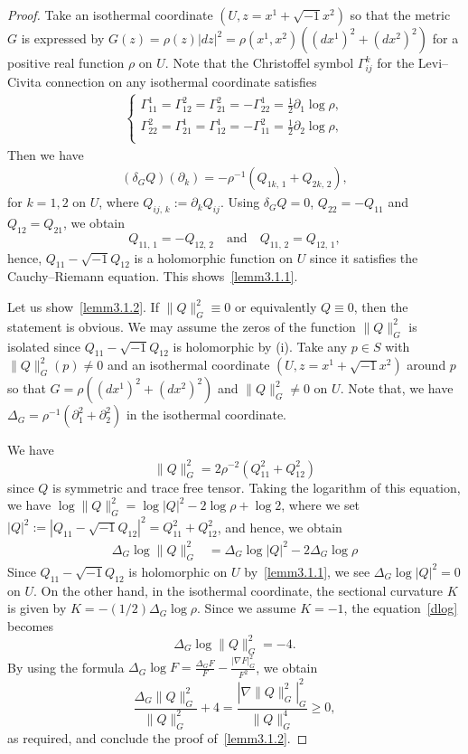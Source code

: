 \documentclass[11pt]{article}
\theoremstyle{definition}
\numberwithin{equation}{section}
\newcommand{\p}{\psi}
\renewcommand*\p{\partial}
\begin{document}
 
\begin{proof}
Take an isothermal coordinate $(U, z=x^1+\sqrt{-1}x^2)$ so that the metric $G$ is expressed by $G(z)=\rho(z)|dz|^2=\rho(x^1, x^2)((dx^1)^2+(dx^2)^2)$ for a positive real function $\rho$ on $U$. Note that the Christoffel symbol $\Gamma_{ij}^k$ for the Levi--Civita connection on any isothermal coordinate satisfies
\begin{align*}
\begin{cases}
\Gamma_{11}^1=\Gamma_{12}^2=\Gamma_{21}^2=-\Gamma_{22}^1=\frac{1}{2}\p_1\log {\rho},\\
\Gamma_{22}^2=\Gamma_{21}^1=\Gamma_{12}^1=-\Gamma_{11}^2=\frac{1}{2}\p_2\log{\rho},\\
\end{cases}
\end{align*}
Then we have
\begin{align*}
(\delta_{G}Q)(\p_k)=-\rho^{-1}(Q_{1k,\,1}+Q_{2k,\,2}),
\end{align*}
for $k=1,2$ on $U$, where $Q_{ij,\,k}:=\p_kQ_{ij}$. Using $\delta_{G}Q=0$, $Q_{22}=-Q_{11}$ and $Q_{12}=Q_{21}$, we obtain
\[
Q_{11,\,1}=-Q_{12,\,2}\quad \text{and}\quad Q_{11,\,2}=Q_{12,\,1},
\]
hence, $Q_{11}-\sqrt{-1}Q_{12}$ is a holomorphic function on $U$ since it satisfies the Cauchy--Riemann equation. This shows~\eqref{lemm3.1.1}.


Let us show~\eqref{lemm3.1.2}. If $\|Q\|_G^2\equiv 0$ or equivalently $Q\equiv 0$, then the statement is obvious. We may assume the zeros of the function $\|Q\|_G^2$ is isolated since $Q_{11}-\sqrt{-1}Q_{12}$ is holomorphic by (i). Take any $p\in S$ with $\|Q\|_G^2(p)\neq 0$ and an isothermal coordinate $(U, z=x^1+\sqrt{-1} x^2)$ around $p$ so that $G=\rho((dx^1)^2+(dx^2)^2)$ and $\|Q\|_G^2\neq 0$ on $U$. Note that, we have $\Delta_G=\rho^{-1}(\p_1^2+\p_2^2)$ in the isothermal coordinate.

We have
\[
\|Q\|_G^2=2\rho^{-2}\left(Q_{11}^2+Q_{12}^2\right)
\]
since $Q$ is symmetric and trace free tensor. Taking the logarithm of this equation, we have $\log\|Q\|_G^2=\log|Q|^2-2\log\rho+\log2$, where we set $|Q|^2:=|Q_{11}-\sqrt{-1}Q_{12}|^2=Q_{11}^2+Q_{12}^2$, and hence, we obtain
\begin{align}\label{dlog}
\Delta_G\log\|Q\|_G^2&=\Delta_{G}\log|Q|^2-2\Delta_G\log\rho
\end{align}
Since $Q_{11}-\sqrt{-1}Q_{12}$ is holomorphic on $U$ by~\eqref{lemm3.1.1}, we see $\Delta_{G}\log|Q|^2=0$ on $U$. On the other hand, in the isothermal coordinate, the sectional curvature $K$ is given by $K=-(1/2)\Delta_G\log \rho$. Since we assume $K=-1$, the equation~\eqref{dlog} becomes
\[
\Delta_G\log\|Q\|_G^2=-4.
\]
By using the formula $\Delta_G\log F=\tfrac{\Delta_G F}{F}-\tfrac{|\nabla F|_G^2}{F^2}$, we obtain
\[
\frac{\Delta_G\|Q\|_G^2}{\|Q\|_G^2}+4=\frac{|\nabla \|Q\|_G^2|_G^2}{\|Q\|_G^4}\geq 0,
\]
as required, and conclude the proof of~\eqref{lemm3.1.2}.
\end{proof}
\end{document}
